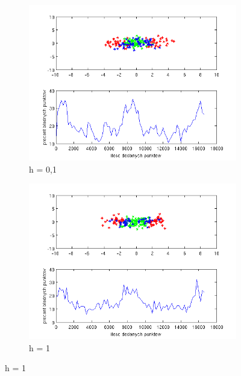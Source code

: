 \documentclass[10pt,a4paper]{article}
\begin{document}
\begin{figure}[H]
   \begin{subfigure}[b]{0.5\textwidth}
    \includegraphics[width=\textwidth]{test2_h0_1.png}
    \caption{h = 0,1}
  \end{subfigure}
  \hfill
  \begin{subfigure}[b]{0.5\textwidth}
    \includegraphics[width=\textwidth]{test2_h1.png}
    \caption{h = 1}
  \end{subfigure}
  

\end{figure}
\end{document}
